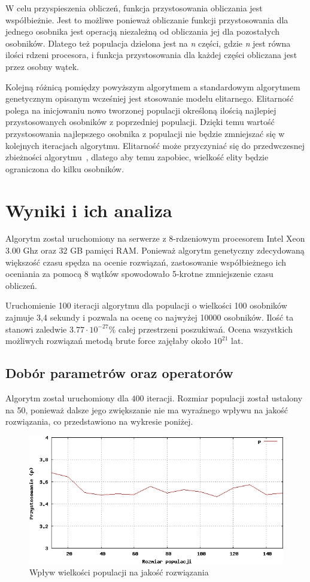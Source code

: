 \documentclass{xmgr}
\begin{document}
W celu przyspieszenia obliczeń, funkcja przystosowania obliczania jest współbieżnie. Jest to możliwe ponieważ obliczanie funkcji przystosowania dla jednego osobnika jest operacją niezależną od obliczania jej dla pozostałych osobników. Dlatego też populacja dzielona jest na \emph{n} części, gdzie \emph{n} jest równa ilości rdzeni procesora, i funkcja przystosowania dla każdej części obliczana jest przez osobny wątek.

Kolejną różnicą pomiędzy powyższym algorytmem a standardowym algorytmem genetycznym opisanym wcześniej jest stosowanie modelu elitarnego. Elitarność polega na inicjowaniu nowo tworzonej populacji określoną ilością najlepiej przystosowanych osobników z poprzedniej populacji. Dzięki temu wartość przystosowania najlepszego osobnika z populacji nie będzie zmniejszać się w kolejnych iteracjach algorytmu. Elitarność może przyczyniać się do przedwczesnej zbieżności algorytmu~\cite{Luke2009Metaheuristics}, dlatego aby temu zapobiec, wielkość elity będzie ograniczona do kilku osobników.


\chapter{Wyniki i ich analiza}

Algorytm został uruchomiony na serwerze z 8-rdzeniowym procesorem Intel Xeon 3.00 Ghz oraz 32 GB pamięci RAM. Ponieważ algorytm genetyczny zdecydowaną większość czasu spędza na ocenie rozwiązań, zastosowanie współbieżnego ich oceniania za pomocą 8 wątków spowodowało 5-krotne zmniejszenie czasu obliczeń.

Uruchomienie 100 iteracji algorytmu dla populacji o wielkości 100 osobników zajmuje 3,4 sekundy i pozwala na ocenę co najwyżej 10000 osobników. Ilość ta stanowi zaledwie $ 3.77 \cdot 10^{-27} \% $ całej przestrzeni poszukiwań. Ocena wszystkich możliwych rozwiązań metodą brute force zajęłaby około $ 10^{21} $ lat.

\section{Dobór parametrów oraz operatorów}

Algorytm został uruchomiony dla $400$ iteracji. Rozmiar populacji został ustalony na 50, ponieważ dalsze jego zwiększanie nie ma wyraźnego wpływu na jakość rozwiązania, co przedstawiono na wykresie poniżej.
\begin{figure}[!tbh]
\centering
\includegraphics[width=.8\hsize]{fig/population_size}
\caption{Wpływ wielkości populacji na jakość rozwiązania}
\end{figure}
\end{document}
